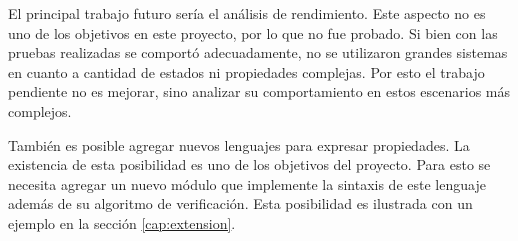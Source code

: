 El principal trabajo futuro sería el análisis de rendimiento.
Este aspecto no es uno de los objetivos en este proyecto, por lo que no fue probado.
Si bien con las pruebas realizadas se comportó adecuadamente, no se utilizaron
 grandes sistemas en cuanto a cantidad de estados ni propiedades complejas.
Por esto el trabajo pendiente no es mejorar, sino analizar su comportamiento en
 estos escenarios más complejos.

También es posible agregar nuevos lenguajes para expresar propiedades.
La existencia de esta posibilidad es uno de los objetivos del proyecto.
Para esto se necesita agregar un nuevo módulo que implemente la sintaxis de este
 lenguaje además de su algoritmo de verificación.
Esta posibilidad es ilustrada con un ejemplo en la sección \ref{cap:extension}.

